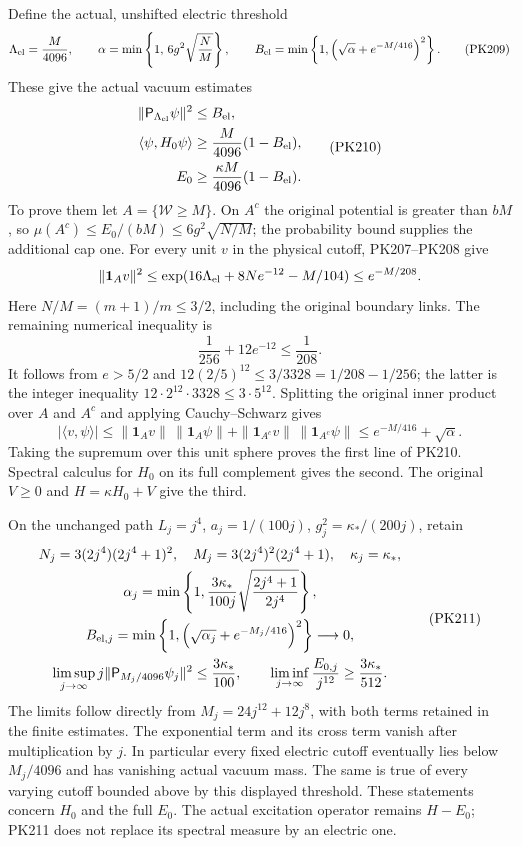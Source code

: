 \documentclass[11pt]{article}
\begin{document}
Define the actual, unshifted electric threshold
\[
 \Lambda_{\rm el}=\frac{M}{4096},\qquad
 \alpha=\min\left\{1,\,6g^2\sqrt{\frac NM}\right\},\qquad
 B_{\rm el}=\min\left\{1,
           \left(\sqrt\alpha+e^{-M/416}\right)^2\right\}.
 \tag{PK209}
\]
These give the actual vacuum estimates
\[
 \begin{split}
 \|\mathsf P_{\Lambda_{\rm el}}\psi\|^2&\le B_{\rm el},\\
 \langle\psi,H_0\psi\rangle
     &\ge \frac{M}{4096}(1-B_{\rm el}),\\
 E_0&\ge \frac{\kappa M}{4096}(1-B_{\rm el}).
 \end{split}\tag{PK210}
\]
To prove them let \(A=\{\mathcal W\ge M\}\).
On \(A^c\) the original potential is greater than \(bM\),
so
\(\mu(A^c)\le E_0/(bM)\le6g^2\sqrt{N/M}\);
the probability bound supplies the additional cap one.
For every unit \(v\) in the physical cutoff, PK207--PK208 give
\[
 \|\mathbf1_Av\|^2
 \le\exp(16\Lambda_{\rm el}+8Ne^{-12}-M/104)
 \le e^{-M/208}.
\]
Here \(N/M=(m+1)/m\le3/2\), including the original boundary
links. The remaining numerical inequality is
\[
 \frac1{256}+12e^{-12}\le\frac1{208}.
\]
It follows from \(e>5/2\) and
\(12(2/5)^{12}\le3/3328=1/208-1/256\);
the latter is the integer inequality
\(12\cdot2^{12}\cdot3328\le3\cdot5^{12}\).
Splitting the original inner product over \(A\) and \(A^c\)
and applying Cauchy--Schwarz gives
\[
 |\langle v,\psi\rangle|
 \le \|\mathbf1_Av\|\,\|\mathbf1_A\psi\|
        +\|\mathbf1_{A^c}v\|\,\|\mathbf1_{A^c}\psi\|
 \le e^{-M/416}+\sqrt\alpha .
\]
Taking the supremum over this unit sphere proves the first
line of PK210. Spectral calculus for \(H_0\) on its full
complement gives the second. The original \(V\ge0\) and
\(H=\kappa H_0+V\) give the third.

On the unchanged path \(L_j=j^4\), \(a_j=1/(100j)\),
\(g_j^2=\kappa_*/(200j)\), retain
\[
 \begin{gathered}
 N_j=3(2j^4)(2j^4+1)^2,\quad
 M_j=3(2j^4)^2(2j^4+1),\quad \kappa_j=\kappa_*,\\
 \alpha_j=\min\left\{1,\frac{3\kappa_*}{100j}
                         \sqrt{\frac{2j^4+1}{2j^4}}\right\},\\
 B_{{\rm el},j}
 =\min\left\{1,
       \left(\sqrt{\alpha_j}+e^{-M_j/416}\right)^2\right\}
       \longrightarrow0,\\
 \limsup_{j\to\infty}j
       \|\mathsf P_{M_j/4096}\psi_j\|^2
       \le\frac{3\kappa_*}{100},\qquad
 \liminf_{j\to\infty}\frac{E_{0,j}}{j^{12}}
       \ge\frac{3\kappa_*}{512}.
 \end{gathered}\tag{PK211}
\]
The limits follow directly from
\(M_j=24j^{12}+12j^8\), with both terms retained in the
finite estimates. The exponential term and its cross term
vanish after multiplication by \(j\). In particular every
fixed electric cutoff eventually lies below \(M_j/4096\)
and has vanishing actual vacuum mass. The same is true of
every varying cutoff bounded above by this displayed threshold.
These statements concern \(H_0\) and the full \(E_0\).
The actual excitation operator remains \(H-E_0\); PK211
does not replace its spectral measure by an electric one.
\end{document}
